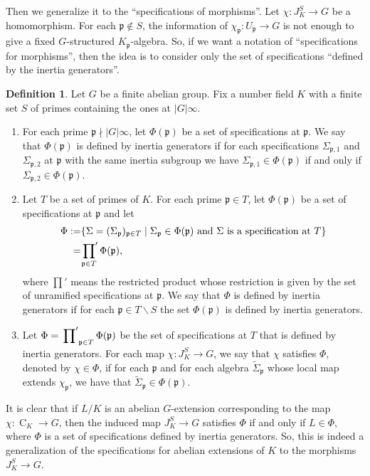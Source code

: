 \documentclass{amsart}
\numberwithin{equation}{section}
\theoremstyle{plain}
\theoremstyle{definition}
\newtheorem{definition}[theorem]{Definition}
\theoremstyle{remark}
\begin{document}
Then we generalize it to the ``specifications of morphisms''.
Let $\chi:J_K^S\to G$ be a homomorphism.
For each $\mathfrak{p}\notin S$, the information of $\chi_{\mathfrak{p}}:U_{\mathfrak{p}}\to G$ is not enough to give a fixed $G$-structured $K_{\mathfrak{p}}$-algebra.
So, if we want a notation of ``specifications for morphisms'', then the idea is to consider only the set of specifications ``defined by the inertia generators''.
\begin{definition}\label{def: specification of a morphism}
    Let $G$ be a finite abelian group.
    Fix a number field $K$ with a finite set $S$ of primes containing the ones at $\lvert G\rvert\infty$.
	\begin{enumerate}
		\item For each prime $\mathfrak{p}\nmid\lvert G\rvert\infty$, let $\Phi(\mathfrak{p})$ be a set of specifications at $\mathfrak{p}$.
		We say that $\Phi(\mathfrak{p})$ is defined by inertia generators if for each specifications $\Sigma_{\mathfrak{p},1}$ and $\Sigma_{\mathfrak{p},2}$ at $\mathfrak{p}$ with the same inertia subgroup we have $\Sigma_{\mathfrak{p},1}\in\Phi(\mathfrak{p})$ if and only if $\Sigma_{\mathfrak{p},2}\in\Phi(\mathfrak{p})$.
		\item Let $T$ be a set of primes of $K$.
		For each prime $\mathfrak{p}\in T$, let $\Phi(\mathfrak{p})$ be a set of specifications at $\mathfrak{p}$ and let
		\begin{equation*}
			\begin{aligned}
				\Phi:=&\{\Sigma=(\Sigma_{\mathfrak{p}})_{\mathfrak{p}\in T}\mid\Sigma_{\mathfrak{p}}\in\Phi(\mathfrak{p})
				\text{ and }\Sigma\text{ is a specification at }T\}
				\\
				=&\sideset{}{'}{\prod}_{\mathfrak{p}\in T}\Phi(\mathfrak{p}),
			\end{aligned}			
		\end{equation*}
		where $\prod'$ means the restricted product whose restriction is given by the set of unramified specifications at $\mathfrak{p}$.
        We say that $\Phi$ is defined by inertia generators if for each $\mathfrak{p}\in T\backslash S$ the set $\Phi(\mathfrak{p})$ is defined by inertia generators.
		\item Let $\Phi=\sideset{}{'}{\prod}_{\mathfrak{p}\in T}\Phi(\mathfrak{p})$ be the set of specifications at $T$ that is defined by inertia generators.
		For each map $\chi:J_K^S\to G$, we say that $\chi$ satisfies $\Phi$, denoted by $\chi\in\Phi$, if for each $\mathfrak{p}$ and for each algebra $\tilde{\Sigma}_{\mathfrak{p}}$ whose local map extends $\chi_{\mathfrak{p}}$, we have that $\tilde{\Sigma}_{\mathfrak{p}}\in\Phi(\mathfrak{p})$.
	\end{enumerate}	
\end{definition}
It is clear that if $L/K$ is an abelian $G$-extension corresponding to the map $\chi:\operatorname{C}_K\to G$, then the induced map $J_K^S\to G$ satisfies $\Phi$ if and only if $L\in\Phi$, where $\Phi$ is a set of specifications defined by inertia generators.
So, this is indeed a generalization of the specifications for abelian extensions of $K$ to the morphisms $J_K^S\to G$.
\end{document}

